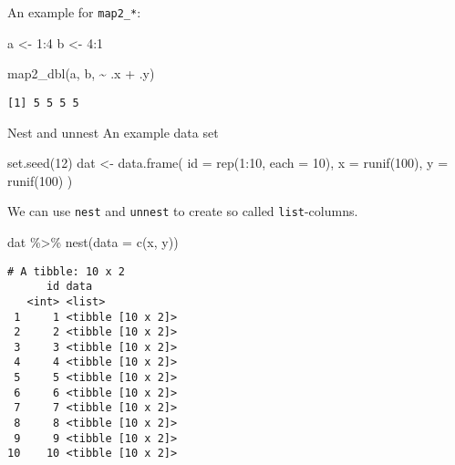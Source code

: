 \documentclass[ignorenonframetext,,t]{beamer}
\newenvironment{Shaded}{\begin{snugshade}}{\end{snugshade}}
\newcommand{\AttributeTok}[1]{\textcolor[rgb]{0.77,0.63,0.00}{#1}}
\newcommand{\DecValTok}[1]{\textcolor[rgb]{0.00,0.00,0.81}{#1}}
\newcommand{\FunctionTok}[1]{\textcolor[rgb]{0.00,0.00,0.00}{#1}}
\newcommand{\NormalTok}[1]{#1}
\newcommand{\OtherTok}[1]{\textcolor[rgb]{0.56,0.35,0.01}{#1}}
\newcommand{\SpecialCharTok}[1]{\textcolor[rgb]{0.00,0.00,0.00}{#1}}
\begin{document}
\begin{frame}[fragile]
An example for \texttt{map2\_*}:

\begin{Shaded}
\begin{Highlighting}[]
\NormalTok{a }\OtherTok{\textless{}{-}} \DecValTok{1}\SpecialCharTok{:}\DecValTok{4}
\NormalTok{b }\OtherTok{\textless{}{-}} \DecValTok{4}\SpecialCharTok{:}\DecValTok{1}

\FunctionTok{map2\_dbl}\NormalTok{(a, b, }\SpecialCharTok{\textasciitilde{}}\NormalTok{ .x }\SpecialCharTok{+}\NormalTok{ .y)}
\end{Highlighting}
\end{Shaded}

\begin{verbatim}
[1] 5 5 5 5
\end{verbatim}

\begin{block}{Nest and unnest}
\protect\hypertarget{nest-and-unnest}{}
An example data set

\begin{Shaded}
\begin{Highlighting}[]
\FunctionTok{set.seed}\NormalTok{(}\DecValTok{12}\NormalTok{)}
\NormalTok{dat }\OtherTok{\textless{}{-}} \FunctionTok{data.frame}\NormalTok{(}
  \AttributeTok{id =} \FunctionTok{rep}\NormalTok{(}\DecValTok{1}\SpecialCharTok{:}\DecValTok{10}\NormalTok{, }\AttributeTok{each =} \DecValTok{10}\NormalTok{), }
  \AttributeTok{x =} \FunctionTok{runif}\NormalTok{(}\DecValTok{100}\NormalTok{), }
  \AttributeTok{y =} \FunctionTok{runif}\NormalTok{(}\DecValTok{100}\NormalTok{)}
\NormalTok{)}
\end{Highlighting}
\end{Shaded}
\end{block}
\end{frame}

\begin{frame}[fragile]
We can use \texttt{nest} and \texttt{unnest} to create so called
\texttt{list}-columns.

\begin{Shaded}
\begin{Highlighting}[]
\NormalTok{dat }\SpecialCharTok{\%\textgreater{}\%} \FunctionTok{nest}\NormalTok{(}\AttributeTok{data =} \FunctionTok{c}\NormalTok{(x, y))}
\end{Highlighting}
\end{Shaded}

\begin{verbatim}
# A tibble: 10 x 2
      id data             
   <int> <list>           
 1     1 <tibble [10 x 2]>
 2     2 <tibble [10 x 2]>
 3     3 <tibble [10 x 2]>
 4     4 <tibble [10 x 2]>
 5     5 <tibble [10 x 2]>
 6     6 <tibble [10 x 2]>
 7     7 <tibble [10 x 2]>
 8     8 <tibble [10 x 2]>
 9     9 <tibble [10 x 2]>
10    10 <tibble [10 x 2]>
\end{verbatim}
\end{frame}
\end{document}
